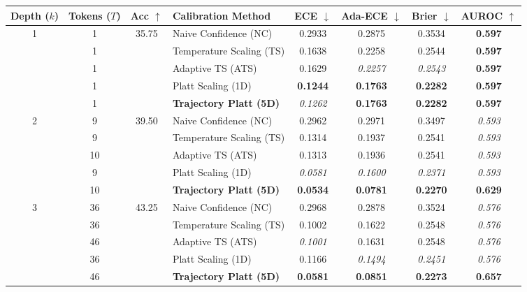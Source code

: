 \begin{table}[t]
\setlength{\tabcolsep}{4pt}
\renewcommand{\arraystretch}{1.05}
\centering
\footnotesize
\begin{tabular}{ccclcccc}
\toprule
\textbf{Depth ($k$)} & \textbf{Tokens ($T$)} & \textbf{Acc} $\uparrow$ & \textbf{Calibration Method} & \textbf{ECE} $\downarrow$ & \textbf{Ada-ECE} $\downarrow$ & \textbf{Brier} $\downarrow$ & \textbf{AUROC} $\uparrow$ \\
\midrule
\multirow{5}{*}{1} & 1 & \multirow{5}{*}{35.75} & Naive Confidence (NC) & 0.2933 & 0.2875 & 0.3534 & \textbf{0.597} \\
 & 1 &  & Temperature Scaling (TS) & 0.1638 & 0.2258 & 0.2544 & \textbf{0.597} \\
 & 1 &  & Adaptive TS (ATS) & 0.1629 & \textit{0.2257} & \textit{0.2543} & \textbf{0.597} \\
 & 1 &  & Platt Scaling (1D) & \textbf{0.1244} & \textbf{0.1763} & \textbf{0.2282} & \textbf{0.597} \\
 & 1 &  & \textbf{Trajectory Platt (5D)} & \textit{0.1262} & \textbf{0.1763} & \textbf{0.2282} & \textbf{0.597} \\
\midrule
\multirow{5}{*}{2} & 9 & \multirow{5}{*}{39.50} & Naive Confidence (NC) & 0.2962 & 0.2971 & 0.3497 & \textit{0.593} \\
 & 9 &  & Temperature Scaling (TS) & 0.1314 & 0.1937 & 0.2541 & \textit{0.593} \\
 & 10 &  & Adaptive TS (ATS) & 0.1313 & 0.1936 & 0.2541 & \textit{0.593} \\
 & 9 &  & Platt Scaling (1D) & \textit{0.0581} & \textit{0.1600} & \textit{0.2371} & \textit{0.593} \\
 & 10 &  & \textbf{Trajectory Platt (5D)} & \textbf{0.0534} & \textbf{0.0781} & \textbf{0.2270} & \textbf{0.629} \\
\midrule
\multirow{5}{*}{3} & 36 & \multirow{5}{*}{43.25} & Naive Confidence (NC) & 0.2968 & 0.2878 & 0.3524 & \textit{0.576} \\
 & 36 &  & Temperature Scaling (TS) & 0.1002 & 0.1622 & 0.2548 & \textit{0.576} \\
 & 46 &  & Adaptive TS (ATS) & \textit{0.1001} & 0.1631 & 0.2548 & \textit{0.576} \\
 & 36 &  & Platt Scaling (1D) & 0.1166 & \textit{0.1494} & \textit{0.2451} & \textit{0.576} \\
 & 46 &  & \textbf{Trajectory Platt (5D)} & \textbf{0.0581} & \textbf{0.0851} & \textbf{0.2273} & \textbf{0.657} \\

\end{tabular}
\end{table}
